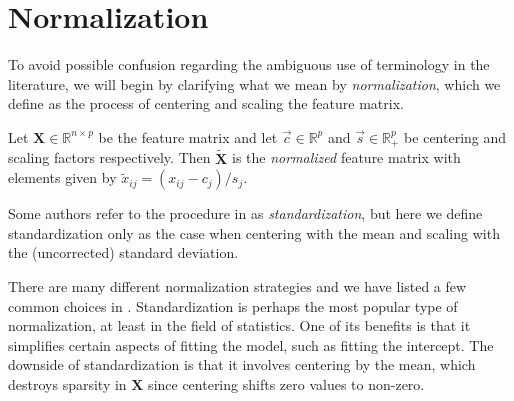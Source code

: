\section{Normalization}
To avoid possible confusion regarding the ambiguous use of terminology in the literature,
we will begin by clarifying what we mean by \emph{normalization}, which we define as the
process of centering and scaling the feature matrix.

\begin{definition}[Normalization]
  \label{def:normalization}
  Let \(\bm{X} \in \mathbb{R}^{n\times p}\) be the feature matrix and let
  \(\vec{c} \in \mathbb{R}^p\) and \(\vec{s} \in \mathbb{R}^p_+\) be centering
  and scaling factors respectively. Then \(\tilde{\bm{X}}\) is the
  \emph{normalized} feature matrix with elements given by
  \(\tilde{x}_{ij} = (x_{ij} - c_j)/s_j\).
\end{definition}

Some authors refer to the procedure in  as \emph{standardization},
but here we define standardization only as the case when centering with the mean and
scaling with the (uncorrected) standard deviation.

There are many different normalization strategies and we have listed a few common choices
in . Standardization is perhaps the most popular type of
normalization, at least in the field of statistics. One of its benefits is that it
simplifies certain aspects of fitting the model, such as fitting the intercept. The
downside of standardization is that it involves centering by the mean, which destroys
sparsity in \(\bm{X}\) since centering shifts zero values to non-zero.

